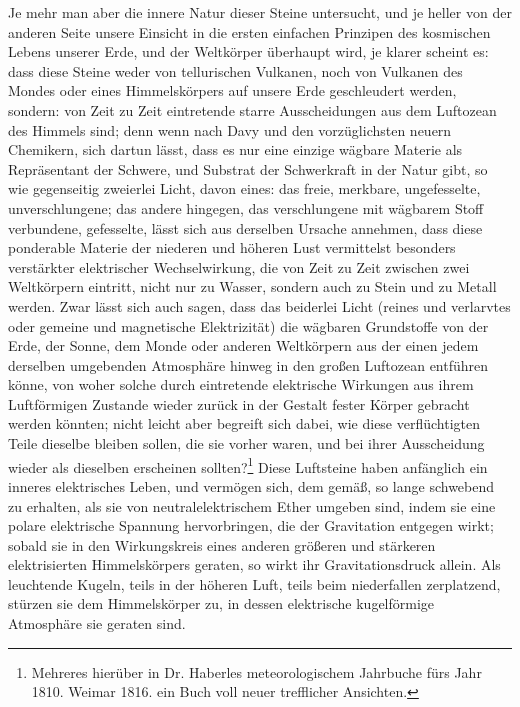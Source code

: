 \documentclass[a4paper, 11pt, oneside, polutonikogreek, german]{article}
\begin{document}
Je mehr man aber die innere Natur dieser Steine untersucht, und je heller von der anderen Seite unsere Einsicht in die ersten einfachen Prinzipen des kosmischen Lebens unserer Erde, und der Weltkörper überhaupt wird, je klarer scheint es: dass diese Steine weder von tellurischen Vulkanen, noch von Vulkanen des Mondes oder eines Himmelskörpers auf unsere Erde geschleudert werden, sondern: von Zeit zu Zeit eintretende starre Ausscheidungen aus dem Luftozean des Himmels sind; denn wenn nach Davy und den vorzüglichsten neuern Chemikern, sich dartun lässt, dass es nur eine einzige wägbare Materie als Repräsentant der Schwere, und Substrat der Schwerkraft in der Natur gibt, so wie gegenseitig zweierlei Licht, davon eines: das freie, merkbare, ungefesselte, unverschlungene; das andere hingegen, das verschlungene mit wägbarem Stoff verbundene, gefesselte, lässt sich aus derselben Ursache annehmen, dass diese ponderable Materie der niederen und höheren Lust vermittelst besonders verstärkter elektrischer Wechselwirkung, die von Zeit zu Zeit zwischen zwei Weltkörpern eintritt, nicht nur zu Wasser, sondern auch zu Stein und zu Metall werden. Zwar lässt sich auch sagen, dass das beiderlei Licht (reines und verlarvtes oder gemeine und magnetische Elektrizität) die wägbaren Grundstoffe von der Erde, der Sonne, dem Monde oder anderen Weltkörpern aus der einen jedem derselben umgebenden Atmosphäre hinweg in den großen Luftozean entführen könne, von woher solche durch eintretende elektrische Wirkungen aus ihrem Luftförmigen Zustande wieder zurück in der Gestalt fester Körper gebracht werden könnten; nicht leicht aber begreift sich dabei, wie diese verflüchtigten Teile dieselbe bleiben sollen, die sie vorher waren, und bei ihrer Ausscheidung wieder als dieselben erscheinen sollten?\footnote{Mehreres hierüber in Dr. Haberles meteorologischem Jahrbuche fürs Jahr 1810. Weimar 1816. ein Buch voll neuer trefflicher Ansichten.} Diese Luftsteine haben anfänglich ein inneres elektrisches Leben, und vermögen sich, dem gemäß, so lange schwebend zu erhalten, als sie von neutralelektrischem Ether umgeben sind, indem sie eine polare elektrische Spannung hervorbringen, die der Gravitation entgegen wirkt; sobald sie in den Wirkungskreis eines anderen größeren und stärkeren elektrisierten Himmelskörpers geraten, so wirkt ihr Gravitationsdruck allein. Als leuchtende Kugeln, teils in der höheren Luft, teils beim niederfallen zerplatzend, stürzen sie dem Himmelskörper zu, in dessen elektrische kugelförmige Atmosphäre sie geraten sind.
\end{document}
